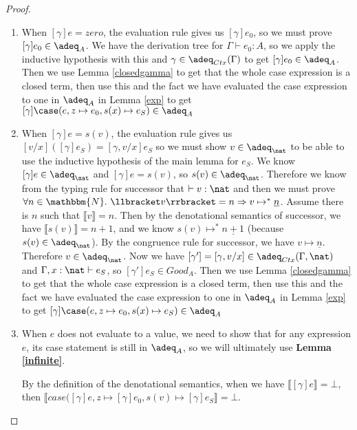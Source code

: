 \begin{proof}
\begin{enumerate}
\item{When $[\gamma]e = zero$, the evaluation rule gives us $[\gamma]e_0$, so we must prove $[\gamma]e_0 \in \adeq_A$. We have the derivation tree for $\Gamma \vdash e_0 : A$, so we apply the inductive hypothesis with this and $\gamma \in \adeq_{Ctx}(\Gamma)$ to get $[\gamma]e_0 \in \adeq_A$. Then we use Lemma \ref{closedgamma} to get that the  whole case expression is a closed term, then use this and the fact we have evaluated the case expression to one in $\adeq_A$ in Lemma \ref{exp} to get $[\gamma]\case(e, z \mapsto e_0, s(x) \mapsto e_S) \in \adeq_A$}
\item{When $[\gamma]e = s(v)$, the evaluation rule gives us $[v/x]([\gamma]e_S) = [\gamma, v/x]e_S$ so we must show $v \in \adeq_{\nat}$ to be able to use the inductive hypothesis of the main lemma for $e_S$. We know $[\gamma]e \in \adeq_{\nat}$ and $[\gamma]e = s(v)$, so $s(v) \in \adeq_{\nat}$. Therefore we know from the typing rule for successor that $\vdash v : \nat$ and then we must prove $\forall n \in \mathbbm{N}. \ \llbracket v \rrbracket = n \Rightarrow v \mapsto^* \underline{n}$. Assume there is $n$ such that $\llbracket v \rrbracket = n$. Then by the denotational semantics of successor, we have $\llbracket s(v) \rrbracket = n + 1$, and we know $s(v) \mapsto^* \underline{n + 1}$ (because $s(v) \in \adeq_{\nat}$). By the congruence rule for successor, we have $v \mapsto \underline{n}$. Therefore $v \in \adeq_{\nat}$. Now we have $[\gamma'] = [\gamma, v/x] \in \adeq_{Ctx}(\Gamma, \nat)$ and $\Gamma, x : \nat \vdash e_S$, so $[\gamma']e_S \in Good_A$. Then we use Lemma \ref{closedgamma} to get that the  whole case expression is a closed term, then use this and the fact we have evaluated the case expression to one in $\adeq_A$ in Lemma \ref{exp} to get $[\gamma]\case(e, z \mapsto e_0, s(x) \mapsto e_S) \in \adeq_A$}
\item{When $e$ does not evaluate to a value, we need to show that for any expression $e$, its case statement is still in $\adeq_A$, so we will ultimately use \textbf{Lemma \ref{infinite}}.

By the definition of the denotational semantics, when we have $\llbracket [\gamma]e \rrbracket = \bot$, then $\llbracket case([\gamma]e, z \mapsto [\gamma]e_0, s(v) \mapsto [\gamma]e_S \rrbracket = \bot$.

}
\end{enumerate}
\end{proof}

